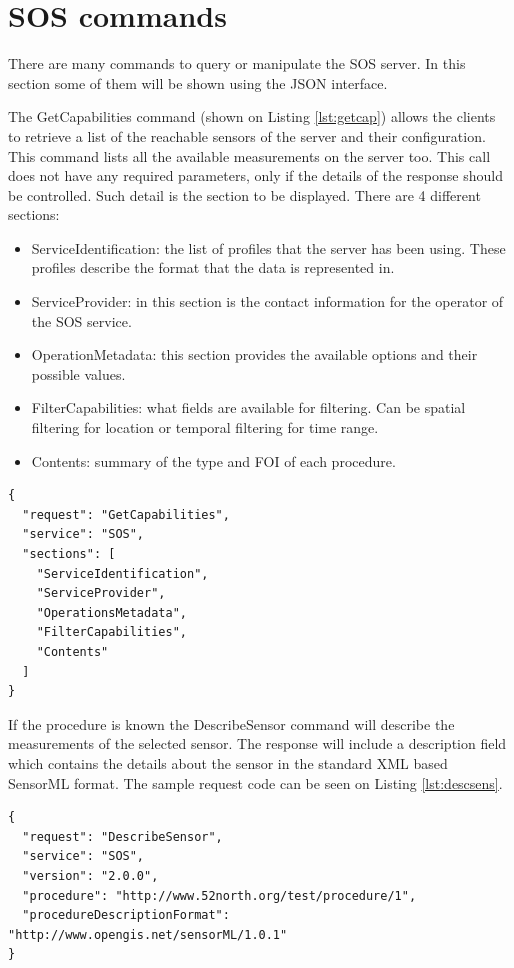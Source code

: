 \section{SOS commands}
There are many commands to query or manipulate the SOS server. In this section some of them will be shown using the JSON interface. 

The GetCapabilities command (shown on Listing \ref{lst:getcap}) allows the clients to retrieve a list of the reachable sensors of the server and their configuration. This command lists all the available measurements on the server too. This call does not have any required parameters, only if the details of the response should be controlled. Such detail is the section to be displayed. There are 4 different sections:
\begin{itemize}
\item ServiceIdentification: the list of profiles that the server has been using. These profiles describe the format that the data is represented in.
\item ServiceProvider: in this section is the contact information for the operator of the SOS service.
\item OperationMetadata: this section provides the available options and their possible values.
\item FilterCapabilities: what fields are available for filtering. Can be spatial filtering for location or temporal filtering for time range.
\item Contents: summary of the type and FOI of each procedure. 
\end{itemize}

\begin{lstlisting}[caption={JSON getCapabilities POST request\label{lst:getcap}}]
{
  "request": "GetCapabilities",
  "service": "SOS",
  "sections": [
    "ServiceIdentification",
    "ServiceProvider",
    "OperationsMetadata",
    "FilterCapabilities",
    "Contents"
  ]
}
\end{lstlisting}

 If the procedure is known the DescribeSensor command will describe the measurements of the selected sensor. The response will include a description field which contains the details about the sensor in the standard XML based SensorML format. The sample request code can be seen on Listing \ref{lst:descsens}.

\begin{lstlisting}[caption={JSON DescribeSensor POST request\label{lst:descsens}}]
{
  "request": "DescribeSensor",
  "service": "SOS",
  "version": "2.0.0",
  "procedure": "http://www.52north.org/test/procedure/1",
  "procedureDescriptionFormat": "http://www.opengis.net/sensorML/1.0.1"
}
\end{lstlisting}

